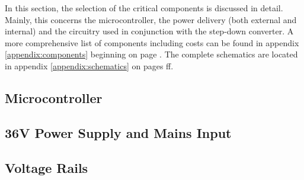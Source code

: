 In  this  section, the  selection  of  the  critical components  is  discussed
in  detail. Mainly,  this concerns  the  microcontroller,  the power  delivery
(both  external and  internal)  and  the circuitry  used  in conjunction  with
the  step-down converter. A  more comprehensive  list of  components including
costs can  be found  in appendix  \ref{appendix:components} beginning  on page
\pageref{appendix:components}. The complete schematics are located in appendix
\ref{appendix:schematics} on pages \pageref{appendix:schematics}ff.


\subsection{Microcontroller}



\subsection{36V Power Supply and Mains Input}



\subsection{Voltage Rails}

